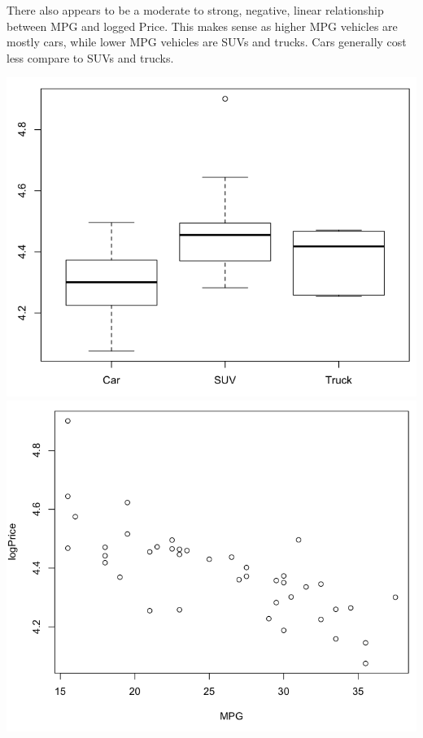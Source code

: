 \documentclass[a4 paper, 11 pt]{article}
\begin{document}
There also appears to be a moderate to strong, negative, linear relationship between MPG and logged Price. This makes sense as higher MPG vehicles are mostly cars, while lower MPG vehicles are SUVs and trucks. Cars generally cost less compare to SUVs and trucks.
\begin{center}
\includegraphics[scale=0.3]{boxtype}
\includegraphics[scale=0.3]{pricempg}
\end{center}
\end{document}
